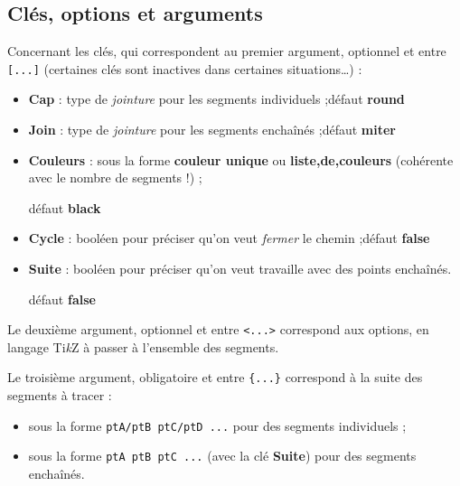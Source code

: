 \documentclass[french,a4paper,11pt]{article}
\providecommand\tikzlogo{Ti\textit{k}Z}
\let\TikZ\tikzlogo
\newcommand\Cle[1]{{\bfseries\sffamily\textlangle #1\textrangle}}
\begin{document}
\begin{DemoCode}

\end{DemoCode}

\subsection{Clés, options et arguments}

\begin{tipblock}
Concernant les \textsf{clés}, qui correspondent au premier argument, optionnel et entre \texttt{[...]} (certaines clés sont inactives dans certaines situations\ldots) :

\begin{itemize}
	\item \Cle{Cap} : type de \textit{jointure} pour les segments individuels ;\hfill{}défaut \Cle{round}
	\item \Cle{Join} : type de \textit{jointure} pour les segments enchaînés ;\hfill{}défaut \Cle{miter}
	\item \Cle{Couleurs} : sous la forme \Cle{couleur unique} ou \Cle{liste,de,couleurs} (cohérente avec le nombre de segments !) ;
	
	\hfill{}défaut \Cle{black}
	\item \Cle{Cycle} : booléen pour préciser qu'on veut \textit{fermer} le chemin ;\hfill{}défaut \Cle{false}
	\item \Cle{Suite} : booléen pour préciser qu'on veut travaille avec des points enchaînés.
	
	\hfill{}défaut \Cle{false}
\end{itemize}
\vspace*{-\baselineskip}\leavevmode
\end{tipblock}

\begin{tipblock}
Le deuxième argument, optionnel et entre \texttt{<...>} correspond aux options, en langage \TikZ{} à passer à l'ensemble des segments.

\smallskip

Le troisième argument, obligatoire et entre \texttt{\{...\}} correspond à la suite des segments à tracer :

\begin{itemize}
	\item sous la forme \texttt{ptA/ptB ptC/ptD ...} pour des segments individuels ;
	\item sous la forme \texttt{ptA ptB ptC ...} (avec la clé \Cle{Suite}) pour des segments enchaînés.
\end{itemize}
\vspace*{-\baselineskip}\leavevmode
\end{tipblock}
\end{document}
